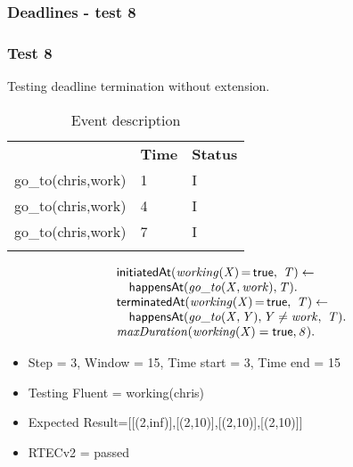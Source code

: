 \documentclass[8pt]{beamer}
\DeclareMathOperator{\val}{=}  %
\def \patsize {}
\def\happensAt{\textsf{\patsize happensAt}}
\def\initiatedAt{\textsf{\patsize initiatedAt}}
\def\terminatedAt{\textsf{\patsize terminatedAt}}
\def\true{\textsf{\patsize true}}
\newenvironment{mysplit}%
  {\arraycolsep 0pt \begin{array}{l}}%
  {\end{array}}
\begin{document}
\begin{frame}
    \frametitle{Deadlines - test 8}
    \subsubsection{Test 8}
    \small
    Testing deadline termination without extension.\linebreak
    \begin{minipage}{0.48\linewidth}
        \begin{table}[t!]
            \caption{Event description}
            \begin{center}

                \begin{tabular}{lll}
                    \hline\noalign{\smallskip}
                    \multicolumn{1}{l}{\textbf{Event}} & \multicolumn{1}{c}{\textbf{Time}} & \multicolumn{1}{c}{\textbf{Status}} \\
                    go\_to(chris,work)& 1 & I\\
                    go\_to(chris,work)& 4 & I\\
                    go\_to(chris,work)& 7 & I\\
                    \noalign{\smallskip}
                    \hline
                \end{tabular}
            \end{center}
        \end{table}
    \end{minipage}
    \begin{minipage}{0.48\linewidth}
        \begin{align*}
            \begin{mysplit}
                \initiatedAt\mathit{(working(X)\val\true,\ T)\leftarrow}\\
                \quad    \happensAt\mathit{(go\_to(X,work),T)}.\\
                \terminatedAt\mathit{(working(X)\val\true,\ T) \leftarrow}\\
                \quad    \happensAt\mathit{(go\_to(X,Y),Y\neq work,\ T)}.\\
                \mathit{maxDuration(working(X)=\true,8)}.\\
            \end{mysplit}
        \end{align*}
    \end{minipage}
    \begin{itemize}
        \item  Step = 3, Window = 15, Time start = 3, Time end = 15
        \item Testing Fluent = working(chris)
        \item Expected Result=[[(2,inf)],[(2,10)],[(2,10)],[(2,10)]]
        \item RTECv2 = passed
    \end{itemize}
\end{frame}
\end{document}
